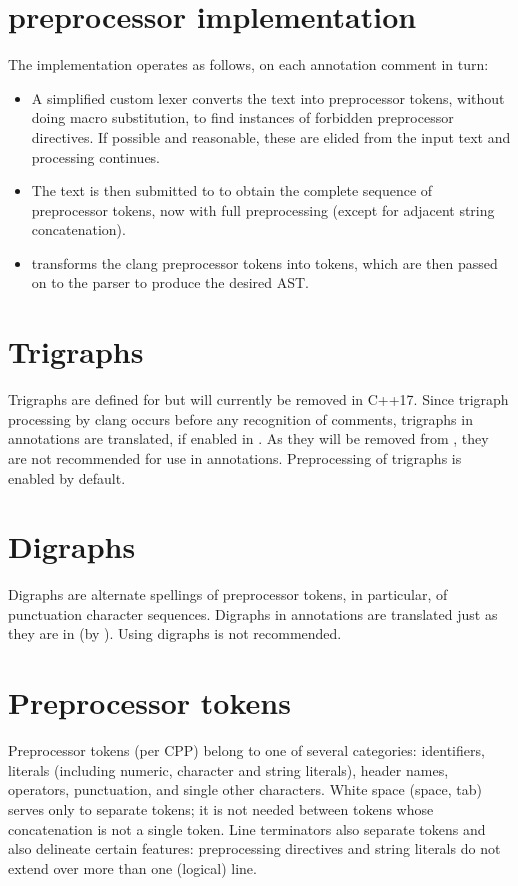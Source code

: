 \section{\fclang preprocessor implementation}
The \fclang implementation operates as follows, on each \acslpp annotation comment in turn:
\begin{itemize}
\item A simplified custom lexer converts the text into preprocessor tokens, without doing macro substitution, to find instances of forbidden preprocessor directives. If possible and reasonable, these are elided from the input text and processing continues.
\item The text is then submitted to \cl to obtain the complete sequence of preprocessor tokens, now with full preprocessing (except for adjacent string concatenation).
\item \fcl transforms the clang preprocessor tokens into \acslpp tokens, which are then passed on to the \acslpp parser to produce the desired AST.
\end{itemize}

\section{Trigraphs}

Trigraphs are defined for \cpp but will currently be removed in C++17. Since trigraph processing by clang occurs before any recognition of comments, trigraphs in \acslpp annotations are translated, if enabled in \clang. As they will be removed from \cpp, they are not recommended for use in \acslpp annotations. Preprocessing of trigraphs is enabled by default.

\section{Digraphs}
Digraphs are alternate spellings of preprocessor tokens, in particular, of
punctuation character sequences. Digraphs in \acslpp annotations are translated just as they are in \cpp (by \clang).
Using digraphs is not recommended.

\section{Preprocessor tokens}
Preprocessor tokens (per CPP) belong to one of several categories: identifiers, literals (including numeric, character and string literals), header names,
operators, punctuation, and single other characters.
White space (space, tab) serves only to separate tokens; it is not needed between tokens whose concatenation is not a single token. Line terminators also separate tokens and also delineate certain features: preprocessing directives and string literals do not extend over more than one (logical) line.

